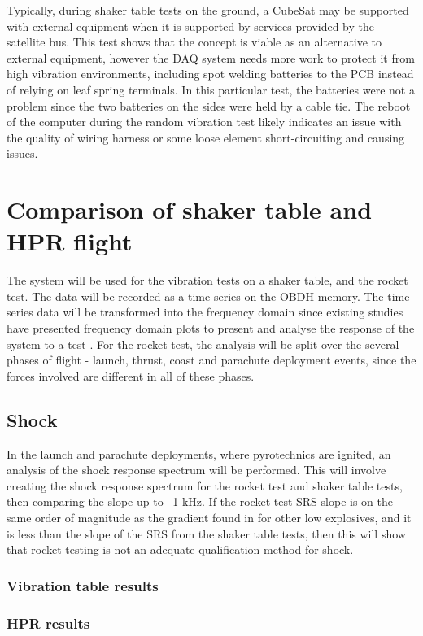 \documentclass[]{report}
\begin{document}
Typically, during shaker table tests on the ground, a CubeSat may be supported with external equipment when it is supported by services provided by the satellite bus. This test shows that the concept is viable as an alternative to external equipment, however the DAQ system needs more work to protect it from high vibration environments, including spot welding batteries to the PCB instead of relying on leaf spring terminals. In this particular test, the batteries were not a problem since the two batteries on the sides were held by a cable tie. The reboot of the computer during the random vibration test likely indicates an issue with the quality of wiring harness or some loose element short-circuiting and causing issues.

\chapter{Comparison of shaker table and HPR flight}

The system will be used for the vibration tests on a shaker table, and the rocket test. The data will be recorded as a time series on the OBDH memory. The time series data will be transformed into the frequency domain since existing studies have presented frequency domain plots to present and analyse the response of the system to a test \cite{nasa-pyroshock,nieto2019cubesat}. For the rocket test, the analysis will be split over the several phases of flight - launch, thrust, coast and parachute deployment events, since the forces involved are different in all of these phases.

\section{Shock}
In the launch and parachute deployments, where pyrotechnics are ignited, an analysis of the shock response spectrum will be performed. This will involve creating the shock response spectrum for the rocket test and shaker table tests, then comparing the slope up to ~1 kHz. If the rocket test SRS slope is on the same order of magnitude as the gradient found in \cite{wang2023numerical} for other low explosives, and it is less than the slope of the SRS from the shaker table tests, then this will show that rocket testing is not an adequate qualification method for shock.
\subsection{Vibration table results}
\subsection{HPR results}
\end{document}

